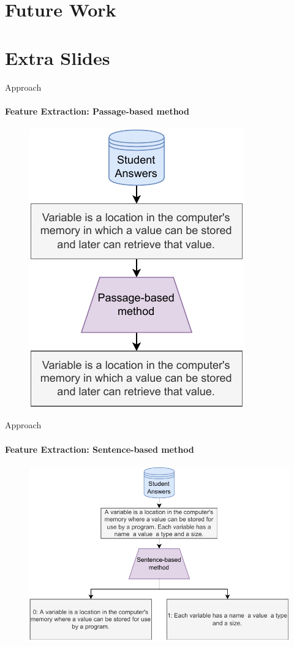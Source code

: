 \documentclass[aspectratio=169]{beamer}
\begin{document}
\section{Future Work}
\section{Extra Slides}
\begin{frame}{Approach}
\framesubtitle{Feature Extraction: Passage-based method}
\begin{figure}
\centering
\includegraphics[scale = 0.65]{images/passage_FE.pdf}
\label{fig:passage fe}
\end{figure}
\end{frame}
\begin{frame}{Approach}
\framesubtitle{Feature Extraction: Sentence-based method}
\begin{figure}
\centering
\includegraphics[scale = 0.65]{images/sentence_FE.pdf}
\label{fig:sentence fe}
\end{figure}
\end{frame}
\end{document}
